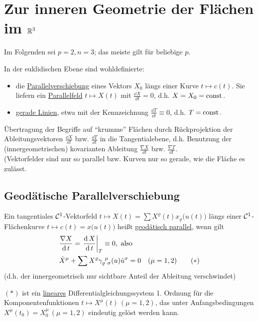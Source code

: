 \section{Zur inneren Geometrie der Flächen im $\mathbb{R}^3$}
Im Folgenden sei \(p = 2, n = 3\); das meiste gilt für beliebige \(p\). \par
In der euklidischen Ebene sind wohldefinierte:
\begin{itemize}
 \item die \uline{Parallelverschiebung} eines Vektors \(X_0\) längs einer Kurve \(t \mapsto c(t)\). Sie liefern ein \uline{Parallelfeld} \(t \mapsto X(t)\) mit \(\frac{\dd X}{\dd t} = 0\), d.h. \(X = X_0 = \operatorname{const}.\)
 \item \uline{gerade Linien}, etwa mit der Kennzeichnung \(\frac{\dd T}{\dd t} \equiv 0\), d.h. \(T = \operatorname{const}.\)
\end{itemize}
Übertragung der Begriffe auf "`krumme"' Flächen durch Rückprojektion der Ableitungsvektoren \(\frac{\dd X}{\dd t}\) bzw. \(\frac{\dd T}{\dd t}\) in die Tangentialebene, d.h. Benutzung der (innergeometrischen) kovarianten Ableitung \(\frac{\nabla X}{\dd t}\) bzw. \(\frac{\nabla T}{\dd t}\). \\
(Vektorfelder sind nur so parallel bzw. Kurven nur so gerade, wie die Fläche es zulässt.

\subsection{Geodätische Parallelverschiebung}
\Rechts
\begin{definition}
 Ein tangentiales \(\mathcal{C}^1\)-Vektorfeld \(t \mapsto X(t) = \sum X^\varrho (t) x_\varrho \big(u(t)\big)\) längs einer \(\mathcal{C}^1\)-Flächenkurve \(t \mapsto c(t) = x\big(u(t)\big)\) heißt \uline{geodätisch parallel}, wenn gilt
 \begin{align*}
  &\frac{\nabla X}{\operatorname{d} t} = \left.\frac{\operatorname{d} X}{\operatorname{d} t}\right|_T \equiv 0, \text{ also} \\
  &\dot X^\mu + \sum X^\varrho \gamma_{\varrho \;\, \sigma}^{\;\, \mu} (u) \dot u^\sigma = 0 \quad (\mu = 1,2) \tag{\(\ast\)}
 \end{align*}
(d.h. der innergeometrisch nur sichtbare Anteil der Ableitung verschwindet) \par
\((\ast)\) ist ein \uline{lineares} Differentialgleichungssystem 1. Ordnung für die Komponentenfunktionen \(t \mapsto X^\mu (t)\, (\mu = 1,2)\), das unter Anfangsbedingungen \(X^\mu(t_0) = X_0^\mu\, (\mu = 1,2)\) eindeutig gelöst werden kann.
\end{definition}

